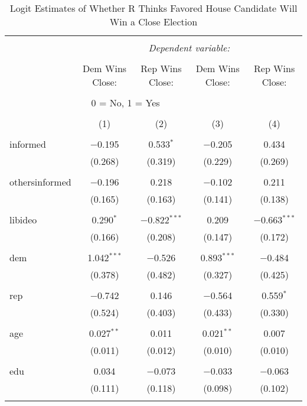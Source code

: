 \documentclass{article}
\begin{document}
\begin{table}[!htbp] \centering 
  \caption{Logit Estimates of Whether R Thinks Favored House Candidate Will Win a Close Election} 
  \label{} 
\begin{tabular}{@{\extracolsep{5pt}}lcccc} 
\\[-1.8ex]\hline 
\hline \\[-1.8ex] 
 & \multicolumn{4}{c}{\textit{Dependent variable:}} \\ 
\cline{2-5} 
\\[-1.8ex] & Dem Wins Close: & Rep Wins Close: & Dem Wins Close: & Rep Wins Close: \\ 
\\[-1.8ex] \multicolumn{4}{c}{0 = No, 1 = Yes} \\
\\[-1.8ex] & (1) & (2) & (3) & (4)\\ 
\hline \\[-1.8ex] 
 informed & $-$0.195 & 0.533$^{*}$ & $-$0.205 & 0.434 \\ 
  & (0.268) & (0.319) & (0.229) & (0.269) \\ 
  & & & & \\ 
 othersinformed & $-$0.196 & 0.218 & $-$0.102 & 0.211 \\ 
  & (0.165) & (0.163) & (0.141) & (0.138) \\ 
  & & & & \\ 
 libideo & 0.290$^{*}$ & $-$0.822$^{***}$ & 0.209 & $-$0.663$^{***}$ \\ 
  & (0.166) & (0.208) & (0.147) & (0.172) \\ 
  & & & & \\ 
 dem & 1.042$^{***}$ & $-$0.526 & 0.893$^{***}$ & $-$0.484 \\ 
  & (0.378) & (0.482) & (0.327) & (0.425) \\ 
  & & & & \\ 
 rep & $-$0.742 & 0.146 & $-$0.564 & 0.559$^{*}$ \\ 
  & (0.524) & (0.403) & (0.433) & (0.330) \\ 
  & & & & \\ 
 age & 0.027$^{**}$ & 0.011 & 0.021$^{**}$ & 0.007 \\ 
  & (0.011) & (0.012) & (0.010) & (0.010) \\ 
  & & & & \\ 
 edu & 0.034 & $-$0.073 & $-$0.033 & $-$0.063 \\ 
  & (0.111) & (0.118) & (0.098) & (0.102) \\ 
  & & & & \\ 

\end{tabular}
\end{table}
\end{document}
